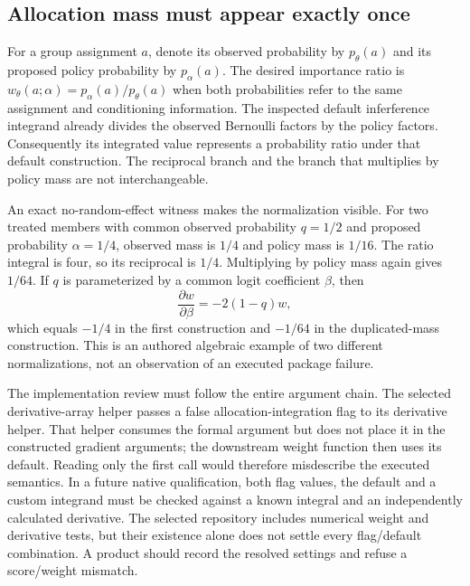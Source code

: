 \subsection{Allocation mass must appear exactly once}
For a group assignment $a$, denote its observed probability by $p_\theta(a)$
and its proposed policy probability by $p_\alpha(a)$. The desired importance
ratio is $w_\theta(a;\alpha)=p_\alpha(a)/p_\theta(a)$ when both probabilities
refer to the same assignment and conditioning information. The inspected
default inferference integrand already divides the observed Bernoulli factors
by the policy factors. Consequently its integrated value represents a
probability ratio under that default construction. The reciprocal branch and
the branch that multiplies by policy mass are not interchangeable.
\citep{exec24_interference_inferference}

An exact no-random-effect witness makes the normalization visible. For two
treated members with common observed probability $q=1/2$ and proposed
probability $\alpha=1/4$, observed mass is $1/4$ and policy mass is $1/16$.
The ratio integral is four, so its reciprocal is $1/4$. Multiplying by policy
mass again gives $1/64$. If $q$ is parameterized by a common logit coefficient
$\beta$, then
\[
 \frac{\partial w}{\partial\beta}=-2(1-q)w,
\]
which equals $-1/4$ in the first construction and $-1/64$ in the duplicated-mass
construction. This is an authored algebraic example of two different
normalizations, not an observation of an executed package failure.
\citep{exec24_interference_reference}

The implementation review must follow the entire argument chain. The selected
derivative-array helper passes a false allocation-integration flag to its
derivative helper. That helper consumes the formal argument but does not place
it in the constructed gradient arguments; the downstream weight function then
uses its default. Reading only the first call would therefore misdescribe the
executed semantics. In a future native qualification, both flag values, the
default and a custom integrand must be checked against a known integral and an
independently calculated derivative. The selected repository includes numerical
weight and derivative tests, but their existence alone does not settle every
flag/default combination. A product should record the resolved settings and
refuse a score/weight mismatch.
\citep{exec24_interference_inferference}

